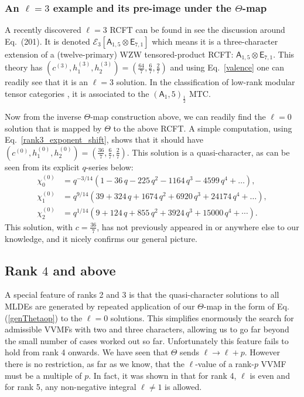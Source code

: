 \documentclass[11pt]{article}
\newcommand\mA{{\mathsf A}}
\newcommand\mE{{\mathsf E}}
\newcommand{\eref}[1]{Eq.\,(\ref{#1})}
\begin{document}
\subsubsection{An $\ell=3$ example and its pre-image under the $\Theta$-map}

A recently discovered $\ell=3$ RCFT can be found in \cite{Rayhaun:2023pgc} see the discussion around Eq.~(201). It is denoted $\mathcal{E}_3[\mA_{1,5}\otimes \mE_{7,1}]$ which means it is a three-character extension of a (twelve-primary) WZW tensored-product RCFT: $\mA_{1,5}\otimes \mE_{7,1}$. This theory has $(c^{(3)},h_1^{(3)},h_2^{(3)}) = (\frac{64}{7},\frac67,\frac27)$ and using Eq.~\eqref{valence} one can readily see that it is an $\ell=3$ solution. In the classification of low-rank modular tensor categories \cite{rowell2009classification}, it is associated to the $(\mA_1,5)_{\frac12}$ MTC.

Now from the inverse $\Theta$-map construction above, we can readily find the $\ell=0$ solution that is mapped by $\Theta$ to the above RCFT. A simple computation, using Eq.~\eqref{rank3_exponent_shift}, shows that it should have  $(c^{(0)}, h_1^{(0)}, h_2^{(0)}) = (\frac{36}{7}, \frac67, \frac27)$. This solution is a quasi-character, as can be seen from its explicit $q$-series below:
\begin{equation}
\begin{split}
  \chi_0^{(0)}
  &=
  q^{-3/14}
  \left(
    1 - 36\,q - 225\,q^2 - 1164\,q^3 - 4599\,q^4
    +\ldots
  \right),
  \\[2mm]
  \chi_1^{(0)}
  &=
  q^{9/14}
  \left(
    39 + 324\,q + 1674\,q^2 + 6920\,q^3 + 24174\,q^4
    +\ldots
  \right),
  \\[2mm]
  \chi_2^{(0)}
  &=
  q^{1/14}
  \left(
    9 + 124\,q + 855\,q^2 + 3924\,q^3 + 15000\,q^4
    +\cdots
  \right).
\end{split}  
\end{equation}
This solution, with $c=\frac{36}{7}$, has not previously appeared in \cite{Mukhi:2020gnj, Govindarajan:2025jlq} or anywhere else to our knowledge, and it nicely confirms our general picture.

\subsection{Rank $4$ and above}

A special feature of ranks 2 and 3 is that the quasi-character solutions to all MLDEs are generated by repeated application of our $\Theta$-map in the form of \eref{genThetaop} to the $\ell=0$ solutions. This simplifies enormously the search for admissible VVMFs with two and three characters, allowing us to go far beyond the small number of cases worked out so far. Unfortunately this feature fails to hold from rank 4 onwards. We have seen that $\Theta$ sends $\ell\to \ell+p$. However there is no restriction, as far as we know, that the $\ell$-value of a rank-$p$ VVMF must be a multiple of $p$. In fact, it was shown in \cite{Kaidi:2021ent} that for rank 4, $\ell$ is even and for rank 5, any non-negative integral $\ell\neq 1$ is allowed. 
\end{document}
